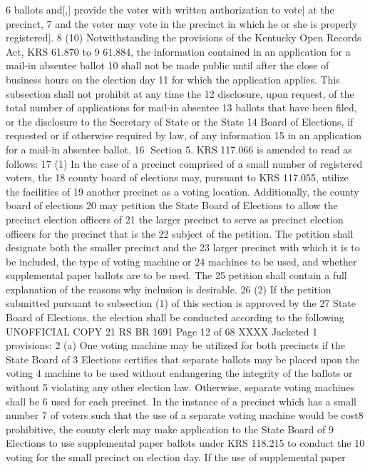 6 ballots and[,] provide the voter with written authorization to vote[ at the precinct,
7 and the voter may vote in the precinct in which he or she is properly registered].
8 (10) Notwithstanding the provisions of the Kentucky Open Records Act, KRS 61.870 to
9 61.884, the information contained in an application for a mail-in absentee ballot
10 shall not be made public until after the close of business hours on the election day
11 for which the application applies. This subsection shall not prohibit at any time the
12 disclosure, upon request, of the total number of applications for mail-in absentee
13 ballots that have been filed, or the disclosure to the Secretary of State or the State
14 Board of Elections, if requested or if otherwise required by law, of any information
15 in an application for a mail-in absentee ballot.
16 Section 5. KRS 117.066 is amended to read as follows:
17 (1) In the case of a precinct comprised of a small number of registered voters, the
18 county board of elections may, pursuant to KRS 117.055, utilize the facilities of
19 another precinct as a voting location. Additionally, the county board of elections
20 may petition the State Board of Elections to allow the precinct election officers of
21 the larger precinct to serve as precinct election officers for the precinct that is the
22 subject of the petition. The petition shall designate both the smaller precinct and the
23 larger precinct with which it is to be included, the type of voting machine or
24 machines to be used, and whether supplemental paper ballots are to be used. The
25 petition shall contain a full explanation of the reasons why inclusion is desirable.
26 (2) If the petition submitted pursuant to subsection (1) of this section is approved by the
27 State Board of Elections, the election shall be conducted according to the following 
UNOFFICIAL COPY 21 RS BR 1691
Page 12 of 68
XXXX Jacketed
1 provisions:
2 (a) One voting machine may be utilized for both precincts if the State Board of
3 Elections certifies that separate ballots may be placed upon the voting
4 machine to be used without endangering the integrity of the ballots or without
5 violating any other election law. Otherwise, separate voting machines shall be
6 used for each precinct. In the instance of a precinct which has a small number
7 of voters such that the use of a separate voting machine would be cost8 prohibitive, the county clerk may make application to the State Board of
9 Elections to use supplemental paper ballots under KRS 118.215 to conduct the
10 voting for the small precinct on election day. If the use of supplemental paper
